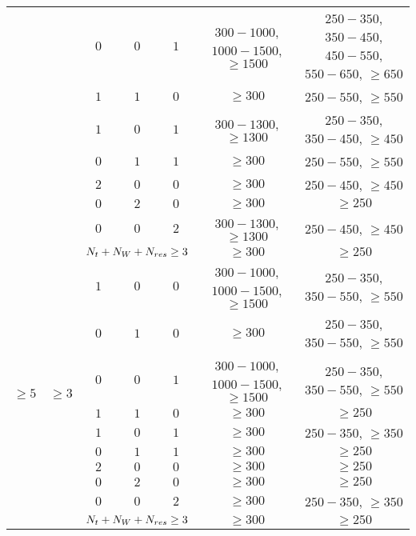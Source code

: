 \begin{table}[!ht]
\begin{center}
{\begin{tabular}{|c|c|c|c|c|c|c|}
						  &					   & $0$			 & $0$				    & $1$	  		& $300-1000$, $1000-1500$, $\geq1500$ & $250-350$, $350-450$, $450-550$, $550-650$, $\geq650$ \\
						  &					   & $1$	 		 & $1$					& $0$			& $\geq300$ 						& $250-550$, $\geq550$ \\
						  &					   & $1$	 		 & $0$					& $1$	  		& $300-1300$, $\geq1300$ & $250-350$, $350-450$, $\geq450$ \\
						  &					   & $0$			 & $1$					& $1$	  		& $\geq300$							& $250-550$, $\geq550$ \\
						  &					   & $2$	 		 & $0$					& $0$			& $\geq300$ 						& $250-450$, $\geq450$ \\
						  &					   & $0$	 		 & $2$					& $0$	  		& $\geq300$ 						& $\geq250$ \\
						  &					   & $0$			 & $0$					& $2$	  		& $300-1300$, $\geq1300$ & $250-450$, $\geq450$ \\
						  &					   & \multicolumn{3}{|c|}{$N_{t}+N_{W}+N_{res}\geq3$} & $\geq300$ 					   & $\geq250$ \\
	\hline
	\multirow{10}{*}{$\geq5$} & \multirow{10}{*}{$\geq3$} & $1$ & $0$ & $0$ & $300-1000$, $1000-1500$, $\geq1500$ & $250-350$, $350-550$, $\geq550$\\
						  &					   & $0$			 & $1$					& $0$			& $\geq300$ 						& $250-350$, $350-550$, $\geq550$\\
						  &					   & $0$			 & $0$				    & $1$	  		& $300-1000$, $1000-1500$, $\geq1500$ & $250-350$, $350-550$, $\geq550$\\
						  &					   & $1$	 		 & $1$					& $0$			& $\geq300$ 						& $\geq250$ \\
						  &					   & $1$	 		 & $0$					& $1$	  		& $\geq300$ 						& $250-350$, $\geq350$ \\
						  &					   & $0$			 & $1$					& $1$	  		& $\geq300$							& $\geq250$ \\
						  &					   & $2$	 		 & $0$					& $0$			& $\geq300$ 						& $\geq250$ \\
						  &					   & $0$	 		 & $2$					& $0$	  		& $\geq300$ 						& $\geq250$ \\
						  &					   & $0$			 & $0$					& $2$	  		& $\geq300$ 					   & $250-350$, $\geq350$ \\
						  &					   & \multicolumn{3}{|c|}{$N_{t}+N_{W}+N_{res}\geq3$} & $\geq300$ 					   & $\geq250$ \\
	\hline
\end{tabular}
}
\end{center}
\end{table}
